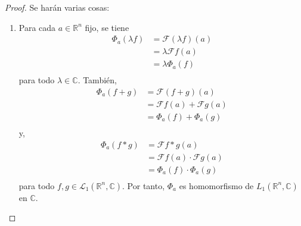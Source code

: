 \documentclass[12pt]{report}
\newcounter{it}
\theoremstyle{largebreak}
\newcommand{\fou}[1]{\ensuremath{\mathcal{F}#1}}
\begin{document}
    \begin{proof}
        Se harán varias cosas:
        \begin{enumerate}
            \item Para cada $a\in\mathbb{R}^n$ fijo, se tiene
            \begin{equation*}
                \begin{split}
                    \Phi_a(\lambda f)&=\fou{(\lambda f)}(a)\\
                    &=\lambda\fou{f}(a)\\
                    &=\lambda\Phi_a(f)\\
                \end{split}
            \end{equation*}
            para todo $\lambda\in\mathbb{C}$. También,
            \begin{equation*}
                \begin{split}
                    \Phi_a(f+g)&=\fou{(f+g)}(a)\\
                    &=\fou{f}(a)+\fou{g}(a)\\
                    &=\Phi_a(f)+\Phi_a(g)\\
                \end{split}
            \end{equation*}
            y,
            \begin{equation*}
                \begin{split}
                    \Phi_a(f*g)&=\fou{f*g}(a)\\
                    &=\fou{f}(a)\cdot\fou{g}(a)\\
                    &=\Phi_a(f)\cdot\Phi_a(g)\\
                \end{split}
            \end{equation*}
            para todo $f,g\in\mathcal{L}_1(\mathbb{R}^n,\mathbb{C})$. Por tanto, $\Phi_a$ es homomorfismo de $L_1(\mathbb{R}^n,\mathbb{C})$ en $\mathbb{C}$.


\end{enumerate}
\end{proof}
\end{document}

